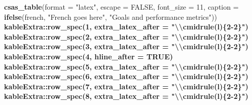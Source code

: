 \documentclass[12pt]{article}\usepackage[]{graphicx}\usepackage[]{color}
\newenvironment{Shaded}{}{}
\newcommand{\KeywordTok}[1]{\textcolor[rgb]{0.00,0.44,0.13}{\textbf{{#1}}}}
\newcommand{\DataTypeTok}[1]{\textcolor[rgb]{0.56,0.13,0.00}{{#1}}}
\newcommand{\DecValTok}[1]{\textcolor[rgb]{0.25,0.63,0.44}{{#1}}}
\newcommand{\CharTok}[1]{\textcolor[rgb]{0.25,0.44,0.63}{{#1}}}
\newcommand{\StringTok}[1]{\textcolor[rgb]{0.25,0.44,0.63}{{#1}}}
\newcommand{\OtherTok}[1]{\textcolor[rgb]{0.00,0.44,0.13}{{#1}}}
\newcommand{\NormalTok}[1]{{#1}}
\newcommand{\OperatorTok}[1]{\textcolor[rgb]{0.00,0.44,0.13}{\textbf{{#1}}}}
\begin{document}
\begin{Shaded}
\begin{Highlighting}[]
{{{{{{\StringTok{  }\KeywordTok{csas_table}\NormalTok{(}\DataTypeTok{format =} \StringTok{"latex"}\NormalTok{,}
             \DataTypeTok{escape =} \OtherTok{FALSE}\NormalTok{,}
             \DataTypeTok{font_size =} \DecValTok{11}\NormalTok{,}
             \DataTypeTok{caption =} \KeywordTok{ifelse}\NormalTok{(french,}
                              \StringTok{"French goes here"}\NormalTok{,}
                              \StringTok{"Goals and performance metrics"}\NormalTok{)) }\OperatorTok{%>%}
\StringTok{  }\NormalTok{kableExtra}\OperatorTok{::}\KeywordTok{row_spec}\NormalTok{(}\DecValTok{1}\NormalTok{, }\DataTypeTok{extra_latex_after =} \StringTok{"}\CharTok{\textbackslash{}\textbackslash{}}\StringTok{cmidrule(l)\{2-2\}"}\NormalTok{) }\OperatorTok{%>%}\StringTok{ }
\StringTok{  }\NormalTok{kableExtra}\OperatorTok{::}\KeywordTok{row_spec}\NormalTok{(}\DecValTok{2}\NormalTok{, }\DataTypeTok{extra_latex_after =} \StringTok{"}\CharTok{\textbackslash{}\textbackslash{}}\StringTok{cmidrule(l)\{2-2\}"}\NormalTok{) }\OperatorTok{%>%}\StringTok{ }
\StringTok{  }\NormalTok{kableExtra}\OperatorTok{::}\KeywordTok{row_spec}\NormalTok{(}\DecValTok{3}\NormalTok{, }\DataTypeTok{extra_latex_after =} \StringTok{"}\CharTok{\textbackslash{}\textbackslash{}}\StringTok{cmidrule(l)\{2-2\}"}\NormalTok{) }\OperatorTok{%>%}\StringTok{ }
\StringTok{  }\NormalTok{kableExtra}\OperatorTok{::}\KeywordTok{row_spec}\NormalTok{(}\DecValTok{4}\NormalTok{, }\DataTypeTok{hline_after =} \OtherTok{TRUE}\NormalTok{) }\OperatorTok{%>%}\StringTok{ }
\StringTok{  }\NormalTok{kableExtra}\OperatorTok{::}\KeywordTok{row_spec}\NormalTok{(}\DecValTok{5}\NormalTok{, }\DataTypeTok{extra_latex_after =} \StringTok{"}\CharTok{\textbackslash{}\textbackslash{}}\StringTok{cmidrule(l)\{2-2\}"}\NormalTok{) }\OperatorTok{%>%}\StringTok{ }
\StringTok{  }\NormalTok{kableExtra}\OperatorTok{::}\KeywordTok{row_spec}\NormalTok{(}\DecValTok{6}\NormalTok{, }\DataTypeTok{extra_latex_after =} \StringTok{"}\CharTok{\textbackslash{}\textbackslash{}}\StringTok{cmidrule(l)\{2-2\}"}\NormalTok{) }\OperatorTok{%>%}\StringTok{ }
\StringTok{  }\NormalTok{kableExtra}\OperatorTok{::}\KeywordTok{row_spec}\NormalTok{(}\DecValTok{7}\NormalTok{, }\DataTypeTok{extra_latex_after =} \StringTok{"}\CharTok{\textbackslash{}\textbackslash{}}\StringTok{cmidrule(l)\{2-2\}"}\NormalTok{) }\OperatorTok{%>%}\StringTok{ }
\StringTok{  }\NormalTok{kableExtra}\OperatorTok{::}\KeywordTok{row_spec}\NormalTok{(}\DecValTok{8}\NormalTok{, }\DataTypeTok{extra_latex_after =} \StringTok{"}\CharTok{\textbackslash{}\textbackslash{}}\StringTok{cmidrule(l)\{2-2\}"}\NormalTok{) }\OperatorTok{%>%}\StringTok{ }
}}}}}}}}}}}}}}}
\end{Highlighting}
\end{Shaded}
\end{document}
